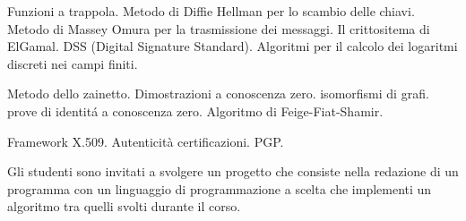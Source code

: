 Funzioni a trappola. Metodo di Diffie Hellman per lo scambio delle
chiavi. Metodo di Massey Omura per la trasmissione dei messaggi.
Il crittositema di ElGamal. DSS (Digital Signature Standard).
Algoritmi per il calcolo dei logaritmi discreti nei campi finiti. 


Metodo dello zainetto. Dimostrazioni a conoscenza zero.
isomorfismi di grafi. prove di identit\'a a conoscenza zero.
Algoritmo di Feige-Fiat-Shamir.


Framework X.509. Autenticit\`a certificazioni. PGP.

\testi  

\bib
{}
\endbib

\bib
{} 
\endbib

\bib                                             
{}
\endbib

\altritesti  

\bib
{} 
\endbib
 
\bib
{} 
\endbib

\esami 

Gli studenti sono invitati a svolgere un progetto che consiste nella 
redazione di un programma con un linguaggio di programmazione a
scelta che implementi un algoritmo tra quelli svolti durante il
corso.
\bye

